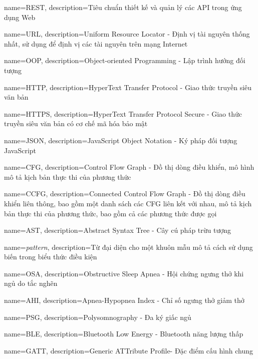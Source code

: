 {
    name=REST,
    description={Tiêu chuẩn thiết kế và quản lý các API trong ứng dụng Web}
}

{
    name=URL,
    description={Uniform Resource Locator - Định vị tài nguyên thống nhất, sử dụng để định vị các tài nguyên trên mạng Internet}
}

{
    name=OOP,
    description={Object-oriented Programming - Lập trình hướng đối tượng}
}

{
    name=HTTP,
    description={HyperText Transfer Protocol - Giao thức truyền siêu văn bản}
}

{
    name=HTTPS,
    description={HyperText Transfer Protocol Secure - Giao thức truyền siêu văn bản có cơ chế mã hóa bảo mật}
}

{
    name=JSON,
    description={JavaScript Object Notation - Ký pháp đối tượng JavaScript}
}

{
    name=CFG,
    description={Control Flow Graph - Đồ thị dòng điều khiển, mô hình mô tả kịch bản thực thi của phương thức}
}

{
    name=CCFG,
    description={Connected Control Flow Graph - Đồ thị dòng điều khiển liên thông, bao gồm một danh sách các CFG liên kết với nhau, mô tả kịch bản thực thi của phương thức, bao gồm cả các phương thức được gọi}
}

{
    name=AST,
    description={Abstract Syntax Tree - Cây cú pháp trừu tượng}
}

{
    name=\textit{pattern},
    description={Từ đại diện cho một khuôn mẫu mô tả cách sử dụng biến trong biểu thức điều kiện}
}

{
    name=OSA,
    description={Obstructive Sleep Apnea - Hội chứng ngưng thở khi ngủ do tắc nghẽn}
}

{
    name=AHI,
    description={Apnea-Hypopnea Index - Chỉ số ngưng thở giảm thở }
}

{
    name=PSG,
    description={Polysomnography - Đa ký giấc ngủ }
}

{
    name=BLE,
    description={Bluetooth Low Energy - Bluetooth năng lượng thấp }
}

{
    name=GATT,
    description={Generic ATTribute Profile- Đặc điểm cấu hình chung }
}



